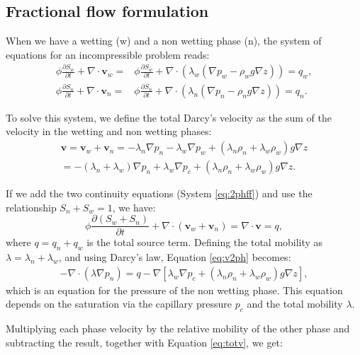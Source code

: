 \documentclass{article}
\begin{document}
\subsection*{Fractional flow formulation}
\hspace{0.5cm}When we have a wetting (w) and a non wetting phase (n), the system of equations for an incompressible problem reads:
\begin{align}\label{eq:2phff}
 \phi\frac{\partial{S}_{w}}{\partial t}+\nabla \cdot  \mathbf{v}_{w}=&\phi\frac{\partial{S}_{w}}{\partial t}+\nabla \cdot ( \lambda_{w}(\nabla p_w-\rho_wg \nabla z))= q_{w},\nonumber \\
 \phi\frac{\partial{S}_{n}}{\partial t}+\nabla \cdot \mathbf{v}_{n}=&\phi\frac{\partial{S}_{n}}{\partial t}+\nabla \cdot ( \lambda_{n}(\nabla p_n-\rho_ng \nabla z))= q_{n}.
\end{align}\par
To solve this system, we define the total Darcy's velocity as the sum of the velocity in the wetting and non wetting phases:
\begin{align}\label{eq:totv}
\mathbf{v}=\mathbf{v}_w+\mathbf{v}_n=-\lambda_{n}\nabla p_n-\lambda_{w}\nabla p_w+(\lambda_n \rho_n+\lambda_w\rho_w)g\nabla z \nonumber \\
=-(\lambda_n+\lambda_w)\nabla p_n+\lambda_w\nabla p_c+(\lambda_n \rho_n+\lambda_w\rho_w)g\nabla z.
\end{align}\par
If we add the two continuity equations (System \eqref{eq:2phff}) and use the relationship $S_n+S_w=1$, we have:
\begin{equation}\label{eq:v2ph}
 \phi\frac{\partial( {S}_{w}+S_n)}{\partial t}+\nabla \cdot ( \mathbf{v}_{w}+\mathbf{v}_n)=  \nabla \cdot \mathbf{v}=q,
\end{equation}
where $q=q_n+q_w$ is the total source term. Defining the total mobility as $\lambda=\lambda_n+\lambda_w$, and using Darcy's law, Equation \eqref{eq:v2ph} becomes:
\begin{align}\label{eq:pnw}
-\nabla \cdot (\lambda \nabla p_n)=q-\nabla[\lambda_w\nabla p_c+(\lambda_n\rho_n+\lambda_w\rho_w)g\nabla z],
\end{align}
which is an equation for the pressure of the non wetting phase. This equation depends on the saturation via the capillary pressure $p_c$ and the total mobility $\lambda$.\par
Multiplying each phase velocity by the relative mobility of the other phase and subtracting the result, together with Equation \eqref{eq:totv}, we get:
\end{document}
